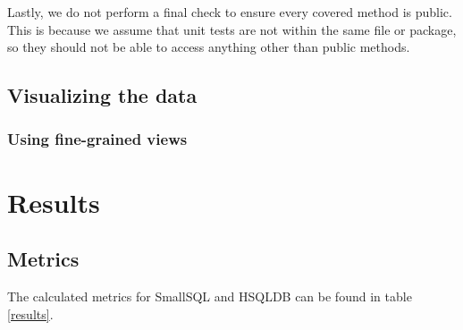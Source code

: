 \documentclass{article}
\begin{document}
Lastly, we do not perform a final check to ensure every covered method is public. This is because we assume that unit tests are not within the same file or package, so they should not be able to access anything other than public methods.

\subsection{Visualizing the data}
\subsubsection{Using fine-grained views}

\section{Results}

\subsection{Metrics}
The calculated metrics for SmallSQL and HSQLDB can be found in table \ref{results}.
\end{document}
